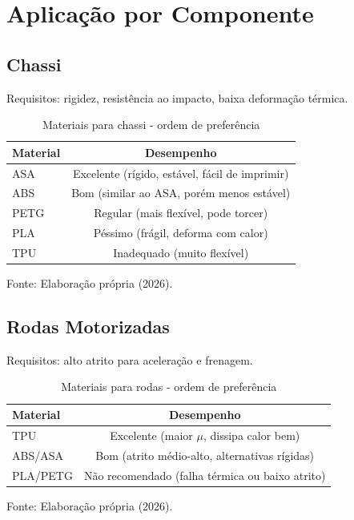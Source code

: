 \documentclass[12pt, a4paper]{article}
\newcommand{\fonte}[1]{\vspace{0.2cm}\par\noindent\fontsize{9}{11}\selectfont Fonte: #1}
\begin{document}
\section{Aplicação por Componente}

\subsection{Chassi}

Requisitos: rigidez, resistência ao impacto, baixa deformação térmica.

\begin{table}[h]
\centering
\caption{Materiais para chassi - ordem de preferência}
\label{tab:chassi}
\begin{tabular}{l|c}
\hline
\textbf{Material} & \textbf{Desempenho} \\ \hline
ASA & Excelente (rígido, estável, fácil de imprimir) \\
ABS & Bom (similar ao ASA, porém menos estável) \\
PETG & Regular (mais flexível, pode torcer) \\
PLA & Péssimo (frágil, deforma com calor) \\
TPU & Inadequado (muito flexível) \\ \hline
\end{tabular}
\fonte{Elaboração própria (2026).}
\end{table}

\subsection{Rodas Motorizadas}

Requisitos: alto atrito para aceleração e frenagem.

\begin{table}[h]
\centering
\caption{Materiais para rodas - ordem de preferência}
\label{tab:rodas}
\begin{tabular}{l|c}
\hline
\textbf{Material} & \textbf{Desempenho} \\ \hline
TPU & Excelente (maior $\mu$, dissipa calor bem) \\
ABS/ASA & Bom (atrito médio-alto, alternativas rígidas) \\
PLA/PETG & Não recomendado (falha térmica ou baixo atrito) \\ \hline
\end{tabular}
\fonte{Elaboração própria (2026).}
\end{table}
\end{document}
